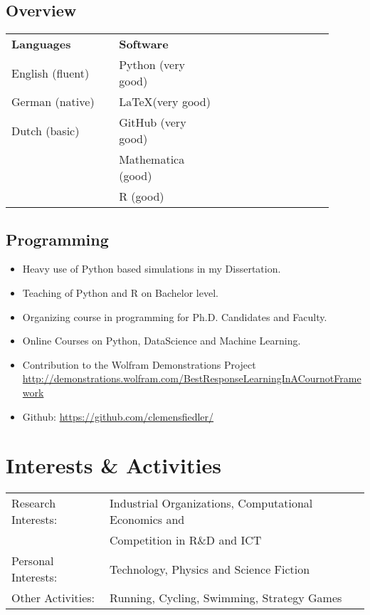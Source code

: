\documentclass[a4paper,12pt]{article}
\begin{document}
\subsection{Overview}\vspace{1em}
\begin{tabular}{p{0.3\linewidth}p{0.3\linewidth}p{0.3\linewidth}}
	\textbf{Languages}	& \textbf{Software}\\
	English (fluent)	& Python (very good)\\
	German (native)		& \LaTeX (very good)\\
	Dutch (basic)		& GitHub (very good)\\
						& Mathematica (good)\\
						& R (good)
\end{tabular}

\subsection{Programming}

\begin{itemize}[noitemsep]
	\item Heavy use of Python based simulations in my Dissertation.
	\item Teaching of Python and R on Bachelor level.
	\item Organizing course in programming for Ph.D. Candidates and Faculty.
	\item Online Courses on Python, DataScience and Machine Learning.
	\item Contribution to the Wolfram Demonstrations Project\\
	\url{http://demonstrations.wolfram.com/BestResponseLearningInACournotFramework}
	\item Github: \url{https://github.com/clemensfiedler/}
\end{itemize}


\section{Interests \& Activities}
\begin{tabular}{ll}
	Research Interests: & Industrial Organizations, Computational Economics and \\
						& Competition in R\&D and ICT\\
	Personal Interests: & Technology, Physics and Science Fiction\\
	Other Activities:   & Running, Cycling, Swimming, Strategy Games
\end{tabular}
\end{document}
